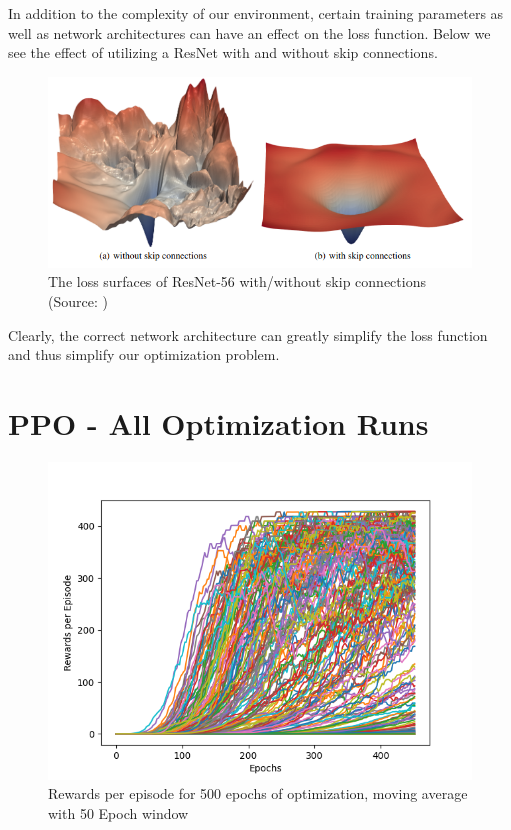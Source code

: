 \documentclass[12pt]{article}
\begin{document}
In addition to the complexity of our environment, certain training parameters as well as network architectures can have an effect on the loss function. Below we see the effect of utilizing a ResNet with and without skip connections. 
\begin{figure}[H]
    \centering
    \includegraphics[scale=0.6]{31.png}
    \caption{The loss surfaces of ResNet-56 with/without skip connections (Source: \textcite{umd})}
    \label{losshit2}
\end{figure}
Clearly, the correct network architecture can greatly simplify the loss function and thus simplify our optimization problem. 
\section{PPO - All Optimization Runs}\label{pporuns}
\begin{figure}[H]
    \centering
    \includegraphics[scale=0.7]{12.png}
    \caption{Rewards per episode for 500 epochs of optimization, moving average with 50 Epoch window}
\end{figure}
\end{document}
